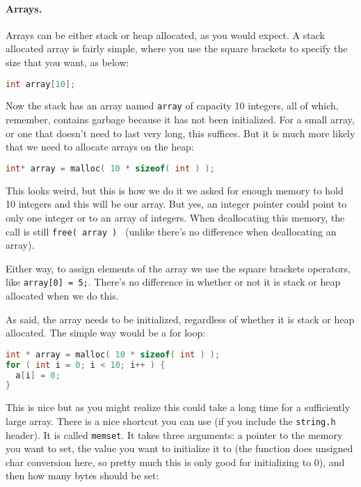 \paragraph{Arrays.}

Arrays can be either stack or heap allocated, as you would expect. A stack allocated array is fairly simple, where you use the square brackets to specify the size that you want, as below:

\begin{lstlisting}[language=C]
int array[10];
\end{lstlisting}

Now the stack has an array named \texttt{array} of capacity 10 integers, all of which, remember, contains garbage because it has not been initialized. For a small array, or one that doesn't need to last very long, this suffices. But it is much more likely that we need to allocate arrays on the heap:

\begin{lstlisting}[language=C]
int* array = malloc( 10 * sizeof( int ) );
\end{lstlisting}

This looks weird, but this is how we do it we asked for enough memory to hold 10 integers and this will be our array. But yes, an integer pointer could point to only one integer or to an array of integers. When deallocating this memory, the call is still \texttt{free( array ) } (unlike \Cpp there's no difference when deallocating an array).

Either way, to assign elements of the array we use the square brackets operators, like \texttt{array[0] = 5;}. There's no difference in whether or not it is stack or heap allocated when we do this.

As said, the array needs to be initialized, regardless of whether it is stack or heap allocated. The simple way would be a for loop:

\begin{lstlisting}[language=C]
int * array = malloc( 10 * sizeof( int ) );
for ( int i = 0; i < 10; i++ ) {
  a[i] = 0;
}
\end{lstlisting}

This is nice but as you might realize this could take a long time for a sufficiently large array. There is a nice shortcut you can use (if you include the \texttt{string.h} header). It is called \texttt{memset}. It takes three arguments: a pointer to the memory you want to set, the value you want to initialize it to (the function does unsigned char conversion here, so pretty much this is only good for initializing to 0), and then how many bytes should be set:

